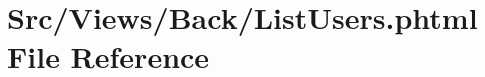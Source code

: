 \hypertarget{_list_users_8phtml}{}\section{Src/\+Views/\+Back/\+List\+Users.phtml File Reference}
\label{_list_users_8phtml}
